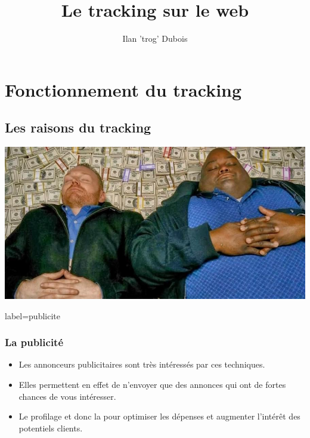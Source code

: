 \documentclass{beamer}
\title{Le tracking sur le web}
\author{Ilan 'trog' Dubois}
\begin{document}
    \begin{frame}
        \titlepage
    \end{frame}
    \section{Fonctionnement du tracking}
    \subsection{Les raisons du tracking}
        \begin{frame}
            \begin{center}
                \includegraphics[scale=0.35]{img/money.jpg}
            \end{center}
        \end{frame}
        \begin{frame}{label=publicite}
            \frametitle{La publicité}
            \begin{center}
                \begin{itemize}
                    \item Les annonceurs publicitaires sont très intéressés par ces techniques.
                    \pause
                    \item Elles permettent en effet de n'envoyer que des annonces qui ont de fortes chances de vous intéresser.
                    \pause
                    \item Le profilage et donc la pour optimiser les dépenses et augmenter l'intérêt des potentiels clients.
                \end{itemize}
            \end{center}
        \end{frame}
\end{document}
